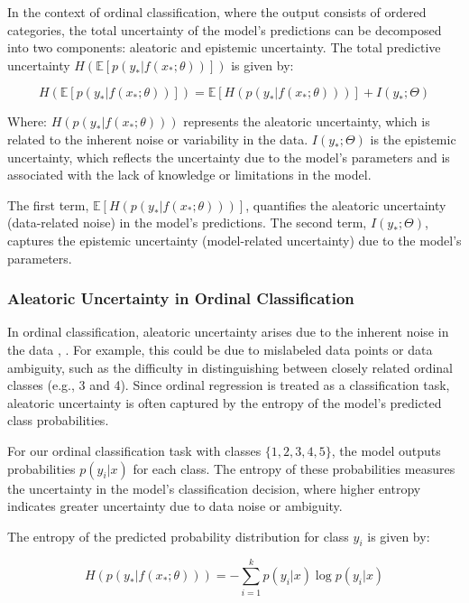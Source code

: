 \documentclass{report}
\begin{document}
In the context of ordinal classification, where the output consists of ordered categories, the total uncertainty of the model’s predictions can be decomposed into two components: aleatoric and epistemic uncertainty. The total predictive uncertainty \( H(\mathbb{E}[p(y_* | f(x_*; \theta))]) \) is given by\cite{band2022benchmarkingbayesiandeeplearning}:

\[
H(\mathbb{E}[p(y_* | f(x_*; \theta))]) = \mathbb{E}[H(p(y_* | f(x_*; \theta)))] + I(y_*; \Theta)
\]

Where:
\( H(p(y_* | f(x_*; \theta))) \) represents the aleatoric uncertainty, which is related to the inherent noise or variability in the data.
\( I(y_*; \Theta) \) is the epistemic uncertainty, which reflects the uncertainty due to the model’s parameters and is associated with the lack of knowledge or limitations in the model.

The first term, \( \mathbb{E}[H(p(y_* | f(x_*; \theta)))] \), quantifies the aleatoric uncertainty (data-related noise) in the model’s predictions. The second term, \( I(y_*; \Theta) \), captures the epistemic uncertainty (model-related uncertainty) due to the model’s parameters.

\subsubsection*{Aleatoric Uncertainty in Ordinal Classification}

In ordinal classification, aleatoric uncertainty arises due to the inherent noise in the data \cite{combalia2020uncertainty}, \cite{carneiro2020deep}. For example, this could be due to mislabeled data points or data ambiguity, such as the difficulty in distinguishing between closely related ordinal classes (e.g., 3 and 4). Since ordinal regression is treated as a classification task, aleatoric uncertainty is often captured by the entropy of the model’s predicted class probabilities.

For our ordinal classification task with classes \( \{1, 2, 3, 4, 5\} \), the model outputs probabilities \( p(y_i | x) \) for each class. The entropy of these probabilities measures the uncertainty in the model’s classification decision, where higher entropy indicates greater uncertainty due to data noise or ambiguity.

The entropy of the predicted probability distribution for class \( y_i \) is given by:

\[
H(p(y_* | f(x_*; \theta))) = - \sum_{i=1}^{k} p(y_i | x) \log p(y_i | x)
\]
\end{document}
